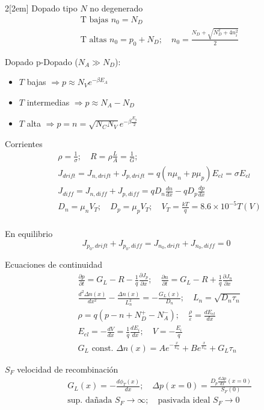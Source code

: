 \documentclass[leqno]{article}
\begin{document}
\begin{multicols}{2}[\columnsep2em]
Dopado tipo $N$ no degenerado
 \begin{align*}
  &\text{T bajas } n_0 = N_D\\
  & \text{T altas } n_0 = p_0+N_D; \quad n_0= \frac{N_D + \sqrt{N_D^2+4n_i^2} }{2}
\end{align*}

Dopado
p-Dopado ($N_A\gg N_D$):
\begin{itemize}[topsep=-6pt, itemsep=0pt]
  \item $T$ bajas  $\Rightarrow p\approx N_Ve ^{-\beta E_A}$
  \item $T$ intermedias  $\Rightarrow p\approx N_A-N_D $
  \item $T$ alta  $\Rightarrow p=n = \sqrt{N_CN_V}e ^{-\beta \frac{E_g}{2}} $
\end{itemize}

Corrientes
\begin{align*}
&\rho = \frac{1}{\sigma }; \quad R = \rho \frac{L}{A} = \frac{1}{G};\\
&J_{drift} = J_{n,drift} + J_{p, drift} = q(n\mu _n+p\mu _p )E_{el} = \sigma E_{el}\\
& J_{diff} = J_{n,diff} + J_{p, diff} = qD_n \frac{dn}{dx} -qD_p \frac{dp}{dx}\\
&D_n = \mu _nV_T; \quad D_p = \mu _pV_T; \quad V_T = \frac{kT}{q}= 8.6\times 10^{-5}T (V)\\
\end{align*}

En equilibrio
\[
J_{p_0, drift} + J_{p_0, diff} = J_{n_0, drift} + J_{n_0, diff} = 0
\] 



Ecuaciones de continuidad
\begin{align*}
  & \frac{\partial p}{\partial t} = G_L -R - \frac{1}{q} \frac{\partial J_p}{\partial x}; \quad  \frac{\partial n}{\partial t} = G_L -R + \frac{1}{q} \frac{\partial J_n}{\partial x}\\
  & \frac{d^2\Delta n(x)}{dx^2} - \frac{\Delta n(x)}{L_n^2} = -\frac{G_L(x)}{D_n}; \quad L_n = \sqrt{D_n \tau _n}\\
  & \rho = q(p-n+N_D^+-N_A^-); \quad \frac{\rho}{\varepsilon } = \frac{dE_{el}}{dx}\\
  & E_{el} = -\frac{dV}{dx} = \frac{1}{q} \frac{dE_i}{dx}; \quad V = -\frac{E_i}{q}\\
  & G_L \text{ const. } \Delta n(x) = A e^{- \frac{x}{L_n}} + Be^{\frac{x}{L_n}} + G_L\tau _n
\end{align*}

$S_F$ velocidad de recombinación
\begin{align*}
  & G_L(x) = -\frac{d\phi_T(x) }{dx}; \quad \Delta p(x=0) = \frac{D_p \frac{d\Delta p}{dx}(x=0)}{S_F(0)}\\
  & \text{sup. dañada } S_F\to \infty ; \quad \text{pasivada ideal } S_F \to 0 
\end{align*}


\end{multicols}
\end{document}
